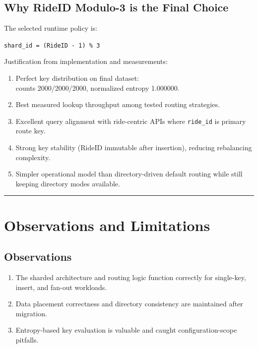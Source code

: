 \documentclass[12pt]{article}
\begin{document}
\subsection{Why RideID Modulo-3 is the Final Choice}

The selected runtime policy is:

\texttt{shard\_id = (RideID - 1) \% 3}

Justification from implementation and measurements:
\begin{enumerate}
    \item Perfect key distribution on final dataset:\\
    counts 2000/2000/2000, normalized entropy 1.000000.

    \item Best measured lookup throughput among tested routing strategies.

    \item Excellent query alignment with ride-centric APIs where \texttt{ride\_id} is primary route key.

    \item Strong key stability (RideID immutable after insertion), reducing rebalancing complexity.

    \item Simpler operational model than directory-driven default routing while still keeping directory modes available.
\end{enumerate}

\hrule
\vspace{0.75em}

\section{Observations and Limitations}

\subsection{Observations}

\begin{enumerate}
    \item The sharded architecture and routing logic function correctly for single-key, insert, and fan-out workloads.
    \item Data placement correctness and directory consistency are maintained after migration.
    \item Entropy-based key evaluation is valuable and caught configuration-scope pitfalls.
\end{enumerate}
\end{document}
